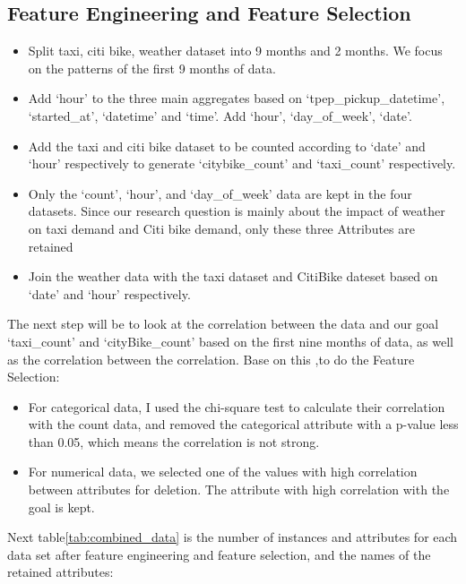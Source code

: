 \documentclass[11pt]{article}
\begin{document}
\subsection{Feature Engineering and Feature Selection}
\begin{itemize}
    \item Split taxi, citi bike, weather dataset into 9 months and 2 months. We focus on the patterns of the first 9 months of data.
    \item Add `hour' to the three main aggregates based on `tpep\_pickup\_datetime', `started\_at', `datetime' and `time'. Add `hour', `day\_of\_week', `date'.
    \item Add  the taxi and citi bike dataset to be counted according to `date' and `hour' respectively to generate `citybike\_count' and `taxi\_count' respectively.
    \item Only the `count’, `hour’, and `day\_of\_week' data are kept in the four datasets. Since our research question is mainly about the impact of weather on taxi demand and Citi bike demand, only these three Attributes are retained
    \item Join the weather data with the taxi dataset and CitiBike dateset based on `date' and `hour' respectively.
\end{itemize}
The next step will be to look at the correlation between the data and our goal `taxi\_count' and `cityBike\_count' based on the first nine months of data, as well as the correlation between the correlation. Base on this ,to do the Feature Selection:
\begin{itemize}
    \item For categorical data, I used the chi-square test to calculate their correlation with the count data, and removed the categorical attribute with a p-value less than 0.05, which means the correlation is not strong.
    \item For numerical data, we selected one of the values with high correlation between attributes for deletion. The attribute with high correlation with the goal is kept.
\end{itemize}
Next table\ref{tab:combined_data} is the number of instances and attributes for each data set after feature engineering and feature selection, and the names of the retained attributes:
\renewcommand{\arraystretch}{1.5}
\end{document}
